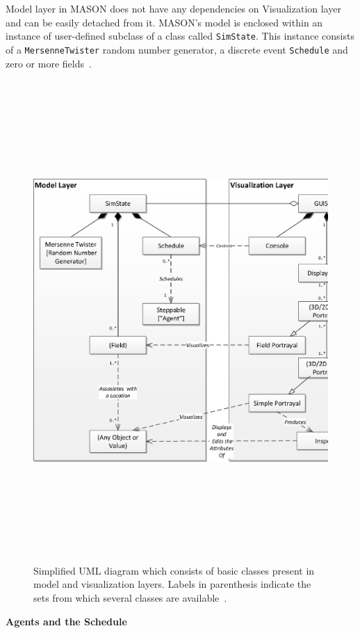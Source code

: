 Model layer in MASON does not have any dependencies on Visualization layer and can be easily detached from it. MASON's model is enclosed within an instance of user-defined subclass of a class called \texttt{SimState}. This instance consists of a \texttt{MersenneTwister} random number generator, a discrete event \texttt{Schedule} and zero or more fields~\cite{MASON2005}.

\vspace{15mm}
\begin{figure}[H]
\flushleft
\includegraphics[height=7.2in, width=4.6in]{Mason_layers.eps}
\caption[Simplified UML diagram of basic classes]{Simplified UML diagram which consists of basic classes present in model and visualization layers. Labels in parenthesis indicate the sets from which several classes are available~\cite{MASON2005}.}
\label{fig:4.1}
\end{figure} 


\vspace{10mm}
\noindent\textbf{Agents and the Schedule}
\vspace{5mm}

